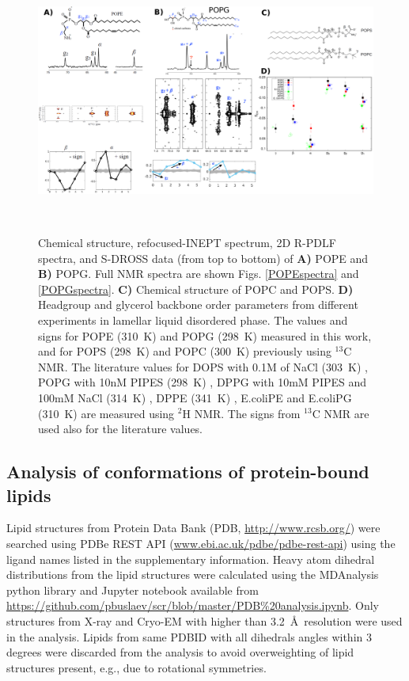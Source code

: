 \documentclass[aps,prl,superscriptaddress,twocolumn]{revtex4}
\begin{document}
\begin{figure}[]
  \centering
   \includegraphics[width=18.0cm]{./Figs/figure1.eps}
   \caption{\label{HGorderParameters}
     Chemical structure, refocused-INEPT spectrum, 2D R-PDLF spectra, and S-DROSS data (from top to bottom) of \textbf{A)} POPE  and \textbf{B)} POPG.
      Full NMR spectra are shown Figs. \ref{POPEspectra} and \ref{POPGspectra}.
     \textbf{C)} Chemical structure of POPC and POPS.
    \textbf{D)} Headgroup and glycerol backbone order parameters from different experiments in lamellar liquid disordered phase.
    The values and signs for POPE (310~K) and POPG (298~K)
    measured in this work, and for POPS (298~K) \cite{antila19} and POPC (300~K) \cite{ferreira13,ferreira16}
    previously using $^{13}$C NMR. The literature values for
    DOPS with 0.1M of NaCl (303~K) \cite{browning80},
    POPG with 10nM PIPES (298~K) \cite{borle85},
    DPPG with 10mM PIPES and 100mM NaCl (314~K) \cite{wohlgemuth80}, 
    DPPE (341~K) \cite{seelig76},
    E.coliPE and E.coliPG (310~K) \cite{gally81}
    are measured using $^2$H NMR. The signs from $^{13}$C NMR are used also for the literature values.
   }
    \\
\end{figure}


\subsection{Analysis of conformations of protein-bound lipids}
Lipid structures from Protein Data Bank (PDB, \url{http://www.rcsb.org/})
were searched using PDBe REST API (\url{www.ebi.ac.uk/pdbe/pdbe-rest-api})
using the ligand names listed in the supplementary information.
Heavy atom dihedral distributions from the lipid structures were calculated
using the MDAnalysis python library \cite{agrawal11,gowers16} and
Jupyter notebook available from \url{https://github.com/pbuslaev/scr/blob/master/PDB%20analysis.ipynb}.
Only structures from X-ray and Cryo-EM with higher than 3.2~\AA~resolution were used in the analysis.
Lipids from same PDBID with all dihedrals angles within 3 degrees were discarded from the analysis
to avoid overweighting of lipid structures present, e.g., due to rotational symmetries.
  
\end{document}
